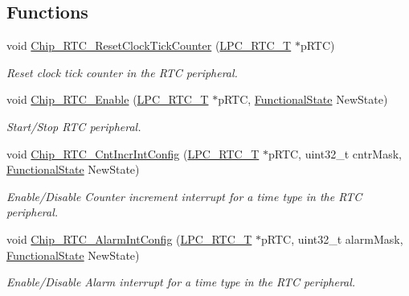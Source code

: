 \subsection*{Functions}
\begin{DoxyCompactItemize}
\item 
void \hyperlink{group___r_t_c__18_x_x__43_x_x_ga1d569e8d5d570f6c79d2d1f803bb5f7c}{Chip\+\_\+\+R\+T\+C\+\_\+\+Reset\+Clock\+Tick\+Counter} (\hyperlink{struct_l_p_c___r_t_c___t}{L\+P\+C\+\_\+\+R\+T\+C\+\_\+T} $\ast$p\+R\+TC)
\begin{DoxyCompactList}\small\item\em Reset clock tick counter in the R\+TC peripheral. \end{DoxyCompactList}\item 
void \hyperlink{group___r_t_c__18_x_x__43_x_x_gaad05032c6d6c4bc5ea9e02311cdc9a18}{Chip\+\_\+\+R\+T\+C\+\_\+\+Enable} (\hyperlink{struct_l_p_c___r_t_c___t}{L\+P\+C\+\_\+\+R\+T\+C\+\_\+T} $\ast$p\+R\+TC, \hyperlink{group___l_p_c___types___public___types_gac9a7e9a35d2513ec15c3b537aaa4fba1}{Functional\+State} New\+State)
\begin{DoxyCompactList}\small\item\em Start/\+Stop R\+TC peripheral. \end{DoxyCompactList}\item 
void \hyperlink{group___r_t_c__18_x_x__43_x_x_gaddaf7559a23df0704358128234fcb214}{Chip\+\_\+\+R\+T\+C\+\_\+\+Cnt\+Incr\+Int\+Config} (\hyperlink{struct_l_p_c___r_t_c___t}{L\+P\+C\+\_\+\+R\+T\+C\+\_\+T} $\ast$p\+R\+TC, uint32\+\_\+t cntr\+Mask, \hyperlink{group___l_p_c___types___public___types_gac9a7e9a35d2513ec15c3b537aaa4fba1}{Functional\+State} New\+State)
\begin{DoxyCompactList}\small\item\em Enable/\+Disable Counter increment interrupt for a time type in the R\+TC peripheral. \end{DoxyCompactList}\item 
void \hyperlink{group___r_t_c__18_x_x__43_x_x_ga2ecd6a555d1a1977a80a30ca21645ca4}{Chip\+\_\+\+R\+T\+C\+\_\+\+Alarm\+Int\+Config} (\hyperlink{struct_l_p_c___r_t_c___t}{L\+P\+C\+\_\+\+R\+T\+C\+\_\+T} $\ast$p\+R\+TC, uint32\+\_\+t alarm\+Mask, \hyperlink{group___l_p_c___types___public___types_gac9a7e9a35d2513ec15c3b537aaa4fba1}{Functional\+State} New\+State)
\begin{DoxyCompactList}\small\item\em Enable/\+Disable Alarm interrupt for a time type in the R\+TC peripheral. \end{DoxyCompactList}\item 

\end{DoxyCompactItemize}
